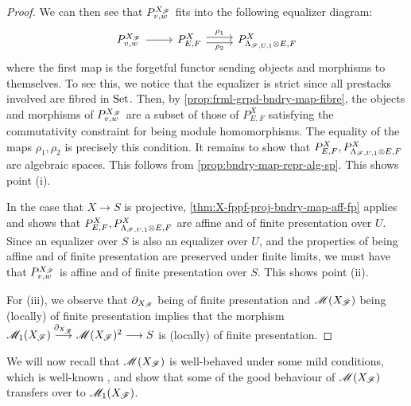 \documentclass[11pt]{amsart}
\begin{document}
\begin{proof}
We can then see that $P^{X_\mathscr{F}}_{v, w}$ fits into the following
equalizer diagram:
\[\begin{tikzcd}
P^{X_\sF}_{v, w} \ar[r] &
P^X_{E, F}
  \ar[r, shift left, "\rho_1" above]
  \ar[r, shift right, "\rho_2" below] &
P^{X}_{\Lambda_{\sF, U, 1} \otimes E, F}
\end{tikzcd}\]
where the first map is the forgetful functor sending objects and morphisms
to themselves. To see this, we notice that the equalizer is strict since
all prestacks involved are fibred in $\mathrm{Set}$. Then, by
\cref{prop:frml-grpd-bndry-map-fibre}, the objects
and morphisms of $P^{X_\mathscr{F}}_{v, w}$ are a subset of those of $P^X_{E, F}$
satisfying the commutativity constraint for being module homomorphisms. The
equality of the maps $\rho_1, \rho_2$ is precisely this condition.
It remains to show that
$P^X_{E, F}, P^X_{\Lambda_{\mathscr{F}, U, 1} \otimes E, F}$ are algebraic spaces.
This follows from \cref{prop:bndry-map-repr-alg-sp}. This shows point (i).

In the case that
$X \to S$ is projective, \cref{thm:X-fppf-proj-bndry-map-aff-fp} applies
and shows that $P^X_{E, F}, P^X_{\Lambda_{\mathscr{F}, U, 1} \otimes E, F}$ are
affine and of finite presentation over $U$. Since an equalizer over $S$
is also an equalizer over $U$, and the properties of being affine and of
finite presentation are preserved under finite limits, we must have that
$P^{X_\mathscr{F}}_{v, w}$ is affine and of finite presentation
over $S$. This shows point (ii).

For (iii), we observe that $\partial_{X_\mathscr{F}}$ being of finite
presentation and $\mathscr{M}(X_\mathscr{F})$ being (locally) of finite presentation implies
that the morphism $\sM_1(X_\sF) \to[\partial_{X_\sF}] \sM(X_\sF)^2 \to S$
is (locally) of finite presentation.
\end{proof}

We will now recall that $\mathscr{M}(X_\mathscr{F})$ is well-behaved under some mild conditions,
which is well-known \cite[Theorem 6.13]{GeomNonAbHodgeFilt},
and show that some of the good behaviour of $\mathscr{M}(X_\mathscr{F})$ transfers
over to $\mathscr{M}_1(X_\mathscr{F})$.
\end{document}
